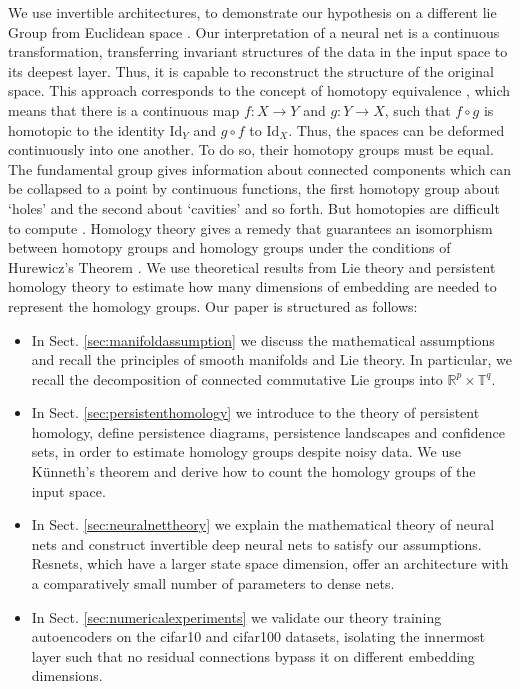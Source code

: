 \documentclass[envcountsect,runningheads]{llncs}
\begin{document}
We use invertible architectures, to demonstrate our hypothesis on a different lie Group from Euclidean space . Our interpretation of a neural net is a continuous transformation, transferring invariant structures of the data in the input space to its deepest layer. Thus, it is capable to reconstruct the structure of the original space. This approach corresponds to the concept of homotopy equivalence , which means that there is a continuous map $f: X \rightarrow Y$ and $g: Y \rightarrow X$, such that $f \circ g$ is homotopic to the identity $\text{Id}_Y$ and $g \circ f$ to $\text{Id}_X$. Thus, the spaces can be deformed continuously into one another. To do so, their homotopy groups must be equal. The fundamental group gives information about connected components which can be collapsed to a point by continuous functions, the first homotopy group about `holes' and the second about `cavities' and so forth. But homotopies are difficult to compute . Homology theory gives a remedy that guarantees an isomorphism between homotopy groups and homology groups under the conditions of Hurewicz's Theorem . We use theoretical results from Lie theory and persistent homology theory to estimate how many dimensions of embedding are needed to represent the homology groups. Our paper is structured as follows:
\begin{itemize}
    \item In Sect. \ref{sec:manifoldassumption} we discuss the mathematical assumptions and recall the principles of smooth manifolds and Lie theory. In particular, we recall the decomposition of connected commutative Lie groups into $\mathbb{R}^p \times \mathbb{T}^q$.
    \item In Sect. \ref{sec:persistenthomology} we introduce to the theory of persistent homology, define persistence diagrams, persistence landscapes and confidence sets, in order to estimate homology groups despite noisy data. We use Künneth's theorem and derive how to count the homology groups of the input space.
    \item In Sect. \ref{sec:neuralnettheory} we explain the mathematical theory of neural nets and construct invertible deep neural nets to satisfy our assumptions. Resnets, which have a larger state space dimension, offer an architecture with a comparatively small number of parameters to dense nets.
    \item In Sect. \ref{sec:numericalexperiments} we validate our theory training autoencoders on the cifar10 and cifar100 datasets, isolating the innermost layer such that no residual connections bypass it on different embedding dimensions.
\end{itemize}
\end{document}
